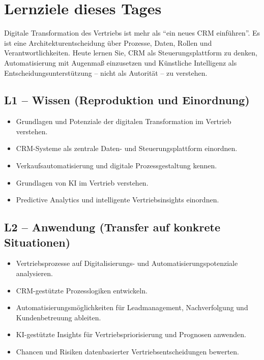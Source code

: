 \documentclass[11pt,a4paper,oneside]{article}
\begin{document}
\section*{Lernziele dieses Tages}
\thispagestyle{plain}

\noindent Digitale Transformation des Vertriebs ist mehr als ``ein neues CRM einführen''. Es ist eine Architekturentscheidung über Prozesse, Daten, Rollen und Verantwortlichkeiten. Heute lernen Sie, CRM als Steuerungsplattform zu denken, Automatisierung mit Augenmaß einzusetzen und Künstliche Intelligenz als Entscheidungsunterstützung -- nicht als Autorität -- zu verstehen.

\subsection*{L1 -- Wissen (Reproduktion und Einordnung)}
\begin{itemize}
  \item Grundlagen und Potenziale der digitalen Transformation im Vertrieb verstehen.
  \item CRM-Systeme als zentrale Daten- und Steuerungsplattform einordnen.
  \item Verkaufsautomatisierung und digitale Prozessgestaltung kennen.
  \item Grundlagen von KI im Vertrieb verstehen.
  \item Predictive Analytics und intelligente Vertriebsinsights einordnen.
\end{itemize}

\subsection*{L2 -- Anwendung (Transfer auf konkrete Situationen)}
\begin{itemize}
  \item Vertriebsprozesse auf Digitalisierungs- und Automatisierungspotenziale analysieren.
  \item CRM-gestützte Prozesslogiken entwickeln.
  \item Automatisierungsmöglichkeiten für Leadmanagement, Nachverfolgung und Kundenbetreuung ableiten.
  \item KI-gestützte Insights für Vertriebspriorisierung und Prognosen anwenden.
  \item Chancen und Risiken datenbasierter Vertriebsentscheidungen bewerten.
\end{itemize}
\end{document}
